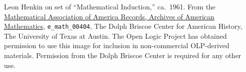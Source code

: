 Leon Henkin on set of ``Mathematical Induction,'' ca.~1961. From the
\href{http://www.cah.utexas.edu/collections/math.php}{Mathematical
Association of America Records, Archives of American Mathematics},
\verb|e_math_00404|, The Dolph Briscoe Center for American History, The
University of Texas at Austin. The Open Logic Project has obtained
permission to use this image for inclusion in non-commercial
OLP-derived materials.  Permission from the Dolph Briscoe Center is
required for any other use.
